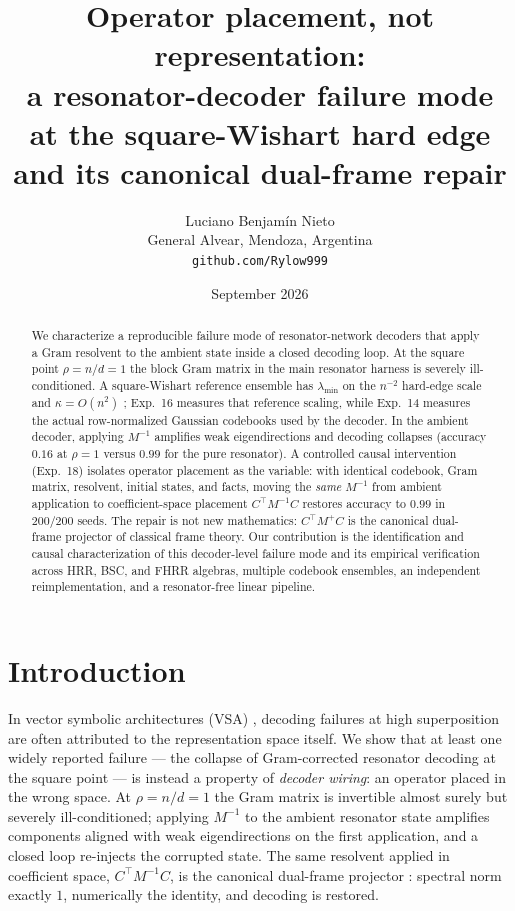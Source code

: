 \documentclass[11pt,a4paper]{article}
\title{Operator placement, not representation:\\ a resonator-decoder failure mode at the square-Wishart hard edge\\ and its canonical dual-frame repair}
\author{Luciano Benjam\'in Nieto\\General Alvear, Mendoza, Argentina\\ \texttt{github.com/Rylow999}}
\date{September 2026}
\begin{document}
\maketitle

\begin{abstract}
We characterize a reproducible failure mode of resonator-network decoders that apply a Gram resolvent to the ambient state inside a closed decoding loop. At the square point $\rho=n/d=1$ the block Gram matrix in the main resonator harness is severely ill-conditioned. A square-Wishart reference ensemble has $\lambda_{\min}$ on the $n^{-2}$ hard-edge scale and $\kappa=O(n^2)$ \citep{marchenko1967distribution, edelman1988eigenvalues, johnstone2001distribution}; Exp.~16 measures that reference scaling, while Exp.~14 measures the actual row-normalized Gaussian codebooks used by the decoder. In the ambient decoder, applying $M^{-1}$ amplifies weak eigendirections and decoding collapses (accuracy $0.16$ at $\rho=1$ versus $0.99$ for the pure resonator). A controlled causal intervention (Exp.~18) isolates operator placement as the variable: with identical codebook, Gram matrix, resolvent, initial states, and facts, moving the \emph{same} $M^{-1}$ from ambient application to coefficient-space placement $C^{\top}M^{-1}C$ restores accuracy to $0.99$ in $200/200$ seeds. The repair is not new mathematics: $C^{\top}M^{+}C$ is the canonical dual-frame projector of classical frame theory. Our contribution is the identification and causal characterization of this decoder-level failure mode and its empirical verification across HRR, BSC, and FHRR algebras, multiple codebook ensembles, an independent reimplementation, and a resonator-free linear pipeline.
\end{abstract}

\section{Introduction}
\label{sec:intro}

In vector symbolic architectures (VSA) \citep{kleyko2021survey, kleyko2022vector}, decoding failures at high superposition are often attributed to the representation space itself. We show that at least one widely reported failure --- the collapse of Gram-corrected resonator decoding at the square point --- is instead a property of \emph{decoder wiring}: an operator placed in the wrong space. At $\rho = n/d = 1$ the Gram matrix is invertible almost surely but severely ill-conditioned; applying $M^{-1}$ to the ambient resonator state amplifies components aligned with weak eigendirections on the first application, and a closed loop re-injects the corrupted state. The same resolvent applied in coefficient space, $C^{\top} M^{-1} C$, is the canonical dual-frame projector \citep{duffin1952class}: spectral norm exactly $1$, numerically the identity, and decoding is restored.
\end{document}
